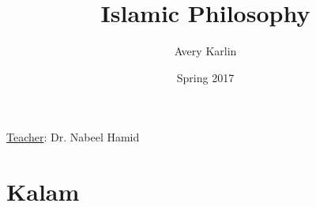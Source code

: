 \documentclass[11 pt, twoside]{article}
\begin{document}
\title{Islamic Philosophy}
\author{Avery Karlin}
\date{Spring 2017}
\newcommand{\teacher}{Dr. Nabeel Hamid}

\maketitle
\newpage
\hypertarget{content}{\tableofcontents}
\vspace{11pt}
\noindent
\underline{Teacher}: \teacher
\newpage

\section{Kalam}
\end{document}
